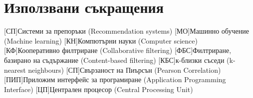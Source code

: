 \chapter{Използвани съкращения}
	\begin{acronym}
		[СП]{Системи за препоръки (Recommendation systems)}
		[МО]{Машинно обучение (Machine learning)}
		[КН]{Компютърни науки (Computer science)}
		[КФ]{Кооперативно филтриране (Collaborative filtering)}
		[ФБС]{Филтриране, базирано на съдържание (Content-based filtering)}
		[КБС]{к-близки съседи (k-nearest neighbours)}
		[СП]{Свързаност на Пиърсън (Pearson Correlation)}
		[ПИП]{Приложим интерфейс за програмиране (Application Programming Interface)}
		[ЦП]{Централен процесор (Central Processing Unit)}
	\end{acronym}